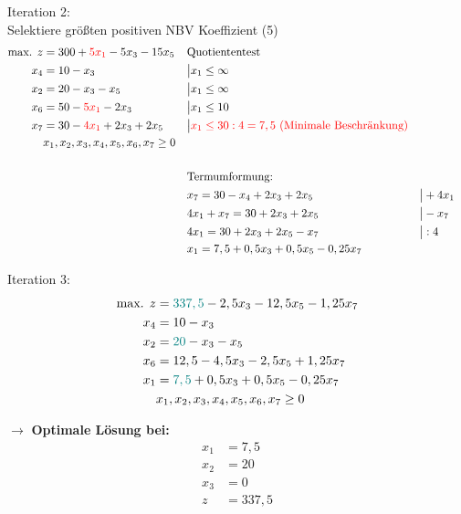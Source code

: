 \documentclass[a4paper,11pt]{article}
\begin{document}
Iteration 2: \\
{\color{red} Selektiere größten positiven NBV Koeffizient (5)}
\begin{align*}
    \text{max. } z &= 300 + {\color{red}5x_{1}} - 5x_{3} - 15x_{5} && \text{Quotiententest} \\
    x_{4} &= 10 - x_{3} && \big| x_{1} \le \infty \\
    x_{2} &= 20 - x_{3} - x_{5} && \big| x_{1} \le \infty \\
    x_{6} &= 50 - {\color{red}5x_{1}} - 2x_{3} && \big| x_{1} \le 10 \\
    x_{7} &= 30 - {\color{red}4x_{1}} + 2x_{3} + 2x_{5} && \big| \color{red} x_{1} \le 30:4=7,5 \text{ (Minimale Beschränkung)} \\
    & x_{1}, x_{2}, x_{3}, x_{4}, x_{5}, x_{6}, x_{7} \ge 0 \\
    \\
    &&& \text{Termumformung:} \\
    &&& x_{7}= 30 -x_{4} +2x_{3} +2x_{5} &&\big| + 4x_{1} \\
    &&& 4x_{1} + x_{7} = 30 +2x_{3} +2x_{5} &&\big| - x_{7} \\
    &&& 4x_{1} = 30 +2x_{3} +2x_{5} - x_{7} &&\big| :4 \\
    &&& x_{1} = 7,5 +0,5x_{3} +0,5x_{5} - 0,25x_{7} \\
\end{align*}

Iteration 3:
\begin{align*}
    \text{max. } z &= {\color{teal}337,5} - 2,5x_{3} - 12,5x_{5} - 1,25x_{7} \\
    x_{4} &= 10 - x_{3} \\
    x_{2} &= {\color{teal}20} - x_{3} - x_{5} \\
    x_{6} &= 12,5 - 4,5x_{3} - 2,5x_{5} + 1,25x_{7} \\
    x_{1} &= {\color{teal}7,5} + 0,5x_{3} + 0,5x_{5} - 0,25x_{7} \\
    & x_{1}, x_{2}, x_{3}, x_{4}, x_{5}, x_{6}, x_{7} \ge 0 \\
\end{align*}

$\to$ \textbf{Optimale Lösung bei:}
\begin{align*}
    x_{1} &= 7,5 \\
    x_{2} &= 20 \\
    x_{3} &= 0 \\
    z &= 337,5 \\
\end{align*}
\end{document}
